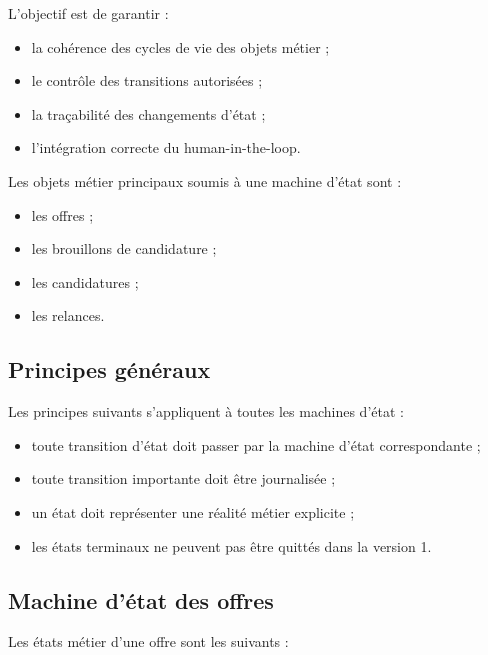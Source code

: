 \documentclass[11pt,a4paper]{article}
\begin{document}
L’objectif est de garantir :

\begin{itemize}
    \item la cohérence des cycles de vie des objets métier ;
    \item le contrôle des transitions autorisées ;
    \item la traçabilité des changements d’état ;
    \item l’intégration correcte du human-in-the-loop.
\end{itemize}

Les objets métier principaux soumis à une machine d’état sont :

\begin{itemize}
    \item les offres ;
    \item les brouillons de candidature ;
    \item les candidatures ;
    \item les relances.
\end{itemize}

\subsection{Principes généraux}

Les principes suivants s’appliquent à toutes les machines d’état :

\begin{itemize}
    \item toute transition d’état doit passer par la machine d’état correspondante ;
    \item toute transition importante doit être journalisée ;
    \item un état doit représenter une réalité métier explicite ;
    \item les états terminaux ne peuvent pas être quittés dans la version 1.
\end{itemize}

\subsection{Machine d’état des offres}

Les états métier d’une offre sont les suivants :
\end{document}
